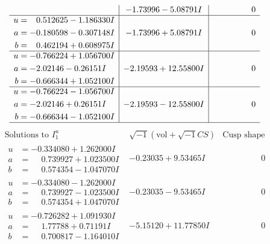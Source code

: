 \documentclass[1p]{elsarticle_modified}
\theoremstyle{definition}
\newcommand{\I}{\sqrt{-1}}
\begin{document}
$$\begin{array}{c|c|c}
 & -1.73996 - 5.08791 I & \phantom{-0.000000 } 0 \\ \hline\begin{aligned}
u &= \phantom{-}0.512625 - 1.186330 I \\
a &= -0.180598 - 0.307148 I \\
b &= \phantom{-}0.462194 + 0.608975 I\end{aligned}
 & -1.73996 + 5.08791 I & \phantom{-0.000000 } 0 \\ \hline\begin{aligned}
u &= -0.766224 + 1.056700 I \\
a &= -2.02146 - 0.26151 I \\
b &= -0.666344 + 1.052100 I\end{aligned}
 & -2.19593 + 12.55800 I & \phantom{-0.000000 } 0 \\ \hline\begin{aligned}
u &= -0.766224 - 1.056700 I \\
a &= -2.02146 + 0.26151 I \\
b &= -0.666344 - 1.052100 I\end{aligned}
 & -2.19593 - 12.55800 I & \phantom{-0.000000 } 0\\
 \hline 
 \end{array}$$\newpage$$\begin{array}{c|c|c}  
\text{Solutions to }I^u_{1}& \I (\text{vol} + \sqrt{-1}CS) & \text{Cusp shape}\\
 \hline 
\begin{aligned}
u &= -0.334080 + 1.262000 I \\
a &= \phantom{-}0.739927 + 1.023500 I \\
b &= \phantom{-}0.574354 - 1.047070 I\end{aligned}
 & -0.23035 + 9.53465 I & \phantom{-0.000000 } 0 \\ \hline\begin{aligned}
u &= -0.334080 - 1.262000 I \\
a &= \phantom{-}0.739927 - 1.023500 I \\
b &= \phantom{-}0.574354 + 1.047070 I\end{aligned}
 & -0.23035 - 9.53465 I & \phantom{-0.000000 } 0 \\ \hline\begin{aligned}
u &= -0.726282 + 1.091930 I \\
a &= \phantom{-}1.77788 + 0.71191 I \\
b &= \phantom{-}0.700817 - 1.164010 I\end{aligned}
 & -5.15120 + 11.77850 I & \phantom{-0.000000 } 0 \\ \hline\begin{aligned}

\end{aligned}
\end{array}$$
\end{document}
